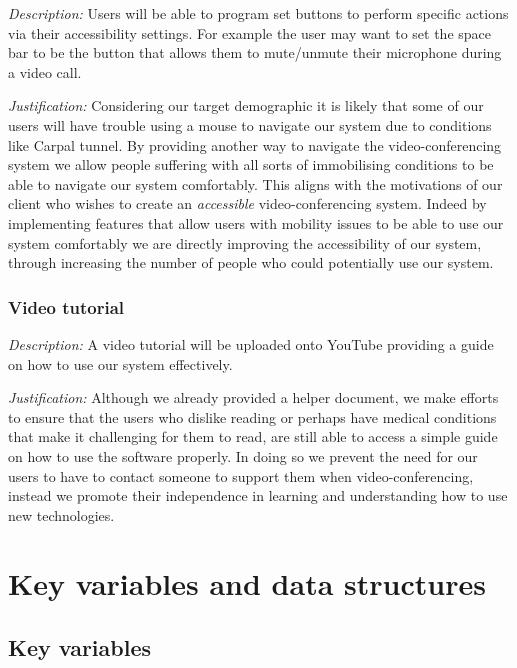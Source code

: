 \textit{Description:}
Users will be able to program set buttons to perform 
specific actions via their accessibility settings. For
example the user may want to set the space bar to be the
button that allows them to mute/unmute their microphone 
during a video call. \\ \vspace{0.2cm}

\textit{Justification:}
Considering our target demographic it is likely that 
some of our users will have trouble using a mouse 
to navigate our system due to conditions like Carpal tunnel.
By providing another way to navigate the video-conferencing 
system we allow people suffering with all sorts of 
immobilising conditions to be able to navigate our system 
comfortably. This aligns with the motivations of our client
who wishes to create an \textit{accessible} video-conferencing
system. Indeed by implementing features that allow users with
mobility issues to be able to use our system comfortably we 
are directly improving the accessibility of our system,
through increasing the number of people who could potentially 
use our system.

\subsubsection{Video tutorial}

\textit{Description:}
A video tutorial will be uploaded onto YouTube providing a 
guide on how to use our system effectively. \\ \vspace{0.2cm}

\textit{Justification:}
Although we already provided a helper document, we make
efforts to ensure that the users who dislike reading or
perhaps have medical conditions that make it challenging for 
them to read, are still able to access a simple guide on 
how to use the software properly. In doing so we prevent the 
need for our users to have to contact someone to support them
when video-conferencing, instead we promote their
independence in learning and understanding how to use new 
technologies.

\section{Key variables and data structures}

\subsection{Key variables}

